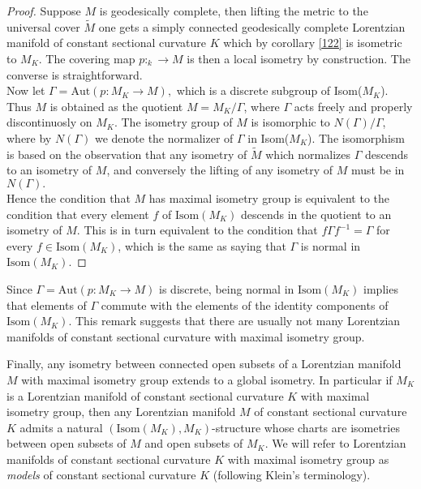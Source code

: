 \begin{proof}
    Suppose $M$ is geodesically complete, then lifting the metric to the universal cover $\tilde{M}$ one gets a simply connected geodesically complete Lorentzian manifold of constant sectional curvature $K$ which by corollary \ref{122} is isometric to $M_K$. The covering map $p:_k\to M$ is then a local isometry by construction. The converse is straightforward. \\   
    Now let $\Gamma=\text{Aut}(p:M_K\to M),$ which is a discrete subgroup of Isom($M_K$). Thus $M$ is obtained as the quotient $M=M_{K}/\Gamma$, where $\Gamma$ acts freely and properly discontinuosly on $M_K$. The isometry group of $M$ is isomorphic to $N(\Gamma)/\Gamma$, where by $N(\Gamma)$ we denote the normalizer of $\Gamma$ in Isom($M_K$). The isomorphism is based on the observation that any isometry of $\tilde{M}$ which normalizes $\Gamma$ descends to an isometry of $M$, and conversely the lifting of any isometry of $M$ must be in $N(\Gamma).$\\
    Hence the condition that $M$ has maximal isometry group is equivalent to the condition that every element $f$ of $\text{Isom}(M_K)$ descends in the quotient to an isometry of $M$. This is in turn equivalent to the condition that $f\Gamma f^{-1}=\Gamma$ for every $f\in \text{Isom}(M_K)$, which is the same as saying that $\Gamma$ is normal in $\text{Isom}(M_K)$.
\end{proof}

\begin{observation}
Since $\Gamma=\text{Aut}(p:M_K\to M)$ is discrete, being normal in $\text{Isom}(M_K)$ implies that elements of $\Gamma$ commute with the elements of the identity components of $\text{Isom}(M_K)$. This remark suggests that there are usually not many Lorentzian manifolds of constant sectional curvature with maximal isometry group.
\end{observation}

Finally, any isometry between connected open subsets of a Lorentzian manifold $M$ with maximal isometry group extends to a global isometry. In particular if $M_K$ is a Lorentzian manifold of constant sectional curvature $K$ with maximal isometry group, then any Lorentzian manifold $M$ of constant sectional curvature $K$ admits a natural $(\text{Isom}(M_K), M_K)$-structure whose charts are isometries between open subsets of $M$ and open subsets of $M_K$. We will refer to Lorentzian manifolds of constant sectional curvature $K$ with maximal isometry group as \textit{models} of constant sectional curvature $K$ (following Klein's terminology).  
